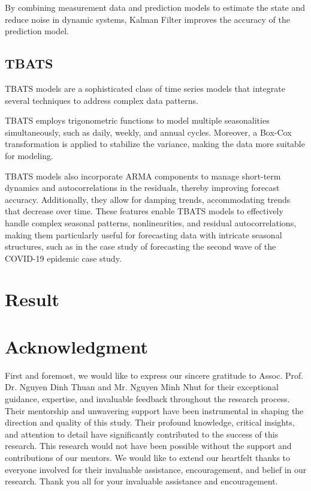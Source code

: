 \documentclass[conference]{IEEEtran}
\begin{document}
By combining measurement data and prediction models to estimate the state and reduce noise in dynamic systems, Kalman Filter improves the accuracy of the prediction model.
\subsection{TBATS}  
TBATS models are a sophisticated class of time series models that integrate several techniques to address complex data patterns. 

TBATS employs trigonometric functions to model multiple seasonalities simultaneously, such as daily, weekly, and annual cycles. Moreover, a Box-Cox transformation is applied to stabilize the variance, making the data more suitable for modeling.

TBATS models also incorporate ARMA components to manage short-term dynamics and autocorrelations in the residuals, thereby improving forecast accuracy. Additionally, they allow for damping trends, accommodating trends that decrease over time. These features enable TBATS models to effectively handle complex seasonal patterns, nonlinearities, and residual autocorrelations, making them particularly useful for forecasting data with intricate seasonal structures, such as in the case study of forecasting the second wave of the COVID-19 epidemic case study.\cite{b5}
\section{Result}


\section*{Acknowledgment}

First and foremost, we would like to express our sincere gratitude to Assoc. Prof. Dr. Nguyen Dinh Thuan and Mr. Nguyen Minh Nhut for their exceptional guidance, expertise, and invaluable feedback throughout the research process. Their mentorship and unwavering support have been instrumental in shaping the direction and quality of this study. Their profound knowledge, critical insights, and attention to detail have significantly contributed to the success of this research. This research would not have been possible without the support and contributions of our mentors. We would like to extend our heartfelt thanks to everyone involved for their invaluable assistance, encouragement, and belief in our research. Thank you all for your invaluable assistance and encouragement.
\end{document}
